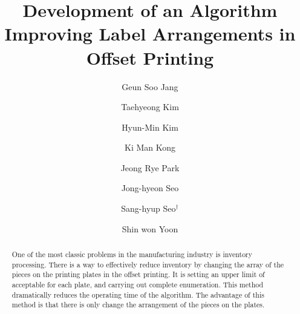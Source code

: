 \documentclass[a4paper]{amsart}
\title[Development of an Algorithm Improving Label Arrangements]{Development of an Algorithm Improving Label Arrangements in Offset Printing}
\author[G. S. Jang]{Geun Soo Jang}
\author[T. H. Kim]{Taehyeong Kim}
\author[H.-M. Kim]{Hyun-Min Kim}
\author[K. M. Kong]{Ki Man Kong}
\author[J. R. Park]{Jeong Rye Park}
\author[J.-H. Seo]{Jong-hyeon Seo}
\author[S.-H. Seo]{Sang-hyup Seo$^{\dagger}$}
\author[S. W. Yoon]{Shin won Yoon}
\numberwithin{equation}{section} %
\numberwithin{figure}{section} %
\numberwithin{table}{section}
\theoremstyle{plain}
\theoremstyle{definition}
\theoremstyle{plain}
\theoremstyle{plain}
\theoremstyle{plain}
\theoremstyle{plain}
\theoremstyle{plain}
\begin{document}
\begin{abstract}
One of the most classic problems in the manufacturing industry is inventory processing. 
There is a way to effectively reduce inventory by 
changing the array of the pieces on the printing plates in the offset printing. 
It is setting an upper limit of acceptable for each plate, and carrying out complete enumeration. 
This method dramatically reduces the operating time of the algorithm. 
The advantage of this method is that there is only change the arrangement of the pieces on the plates.
\end{abstract}

\maketitle

\end{document}
